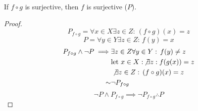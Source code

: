 \begin{question}
	If $f\circ g$ is surjective, then $f$ is surjective ($P$).

	\begin{proof}

		$$ P_{f\circ g}=	\forall x \in X \exists z \in Z : \, (f\circ g)(x) = z $$
		$$ P = \forall y \in Y \exists z \in Z :\, f(y) = x$$
		\begin{align*}
			P_{f\circ g}\wedge		\neg P   \implies
			     & \exists z \in Z  \forall y \in Y :\, f(y) \neq z \\
			     & {\text{let } } x \in X :\, \not\exists z : f(g(x)) = z    \\
			     & \not\exists z \in Z :\, (f\circ g)(x) = z        \\
			\sim & \neg P_{f\circ g}
		\end{align*}
		$$ \neg P \wedge P_{f\circ g} \implies \neg P_{f\circ g} \therefore P $$

	\end{proof}
\end{question}
